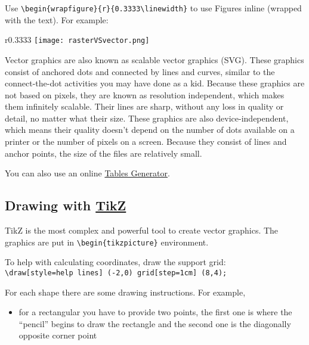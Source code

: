 \documentclass[a4paper,11pt]{article}
\begin{document}
Use \verb|\begin{wrapfigure}{r}{0.3333\linewidth}| to use Figures inline (wrapped with the text). For example: \\

\begin{wrapfigure}{r}{0.3333\linewidth}
	\texttt{[image: rasterVSvector.png]}
	\caption{Two types of graphics}
	\label{fig:types}
\end{wrapfigure}

Vector graphics are also known as scalable vector graphics (SVG). These graphics consist of anchored dots and connected by lines and curves, similar to the connect-the-dot activities you may have done as a kid. Because these graphics are not based on pixels, they are known as resolution independent, which makes them infinitely scalable. Their lines are sharp, without any loss in quality or detail, no matter what their size. These graphics are also device-independent, which means their quality doesn't depend on the number of dots available on a printer or the number of pixels on a screen. Because they consist of lines and anchor points, the size of the files are relatively small.

You can also use an online \href{https://www.tablesgenerator.com/}{Tables Generator}.

\subsection{Drawing with \href{https://www.overleaf.com/learn/latex/TikZ_package}{TikZ}}

TikZ is the most complex and powerful tool to create vector graphics.
The graphics are put in \verb|\begin{tikzpicture}| environment.

\medskip

To help with calculating coordinates, draw the support grid: \\ \verb|\draw[style=help lines] (-2,0) grid[step=1cm] (8,4);|

\medskip

For each shape there are some drawing instructions. 
For example, 
\begin{itemize}
	\item for a rectangular you have to provide two points, the first one is where the ``pencil'' begins to draw the rectangle and the second one is the diagonally opposite corner point
\end{itemize}
\end{document}
